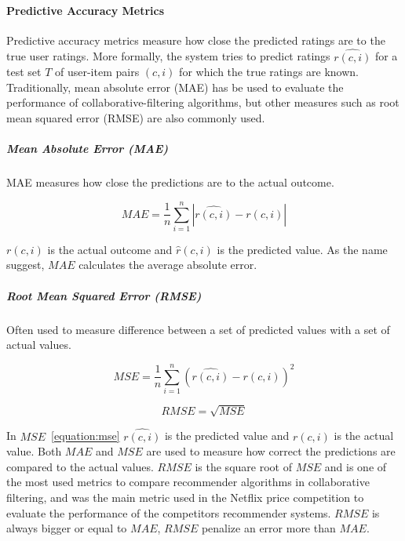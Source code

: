 \paragraph{Predictive Accuracy Metrics}

Predictive accuracy metrics measure how close the predicted ratings are to the
true user ratings. More formally, the system tries to predict ratings
$\hat{r(c,i)}$ for a test set $T$ of user-item pairs $(c, i)$ for which the
true ratings are known. Traditionally, mean absolute error (MAE) has be used to
evaluate the performance of collaborative-filtering algorithms, but other
measures such as root mean squared error (RMSE) are also commonly used.

\subparagraph{Mean Absolute Error (MAE)}

MAE measures how close the predictions are to the actual outcome.

\begin{equation}
    MAE = \frac{1}{n}\sum_{i=1}^{n}{|\hat{r(c,i)}-r(c,i)|}
    \label{equation:mae}
\end{equation}

$r(c,i)$ is the actual outcome and $\hat{r}(c,i)$ is the predicted value.
As the name suggest, $MAE$ calculates the average absolute error.

\subparagraph{Root Mean Squared Error (RMSE)}

Often used to measure difference between a set of predicted values with a set of actual values.

\begin{equation}
    MSE = \frac{1}{n}\sum_{i=1}^{n}{(\hat{r(c,i)} - r(c,i))^{2}}
    \label{equation:mse}
\end{equation}

\begin{equation}
    RMSE = \sqrt{MSE}
    \label{equation:rmse}
\end{equation}

In $MSE$~\ref{equation:mse} $\hat{r(c,i)}$ is the predicted value and $r(c,i)$
is the actual value.  Both $MAE$ and $MSE$ are used to measure how correct the
predictions are compared to the actual values.  $RMSE$ is the square root of
$MSE$ and is one of the most used metrics to compare recommender algorithms in
collaborative filtering, and was the main metric used in the Netflix price
competition to evaluate the performance of the competitors recommender systems.
$RMSE$ is always bigger or equal to $MAE$, $RMSE$ penalize an error more than
$MAE$.

